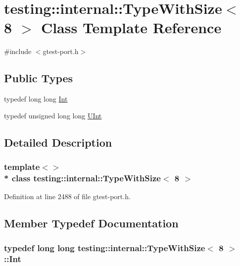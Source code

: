 \hypertarget{classtesting_1_1internal_1_1_type_with_size_3_018_01_4}{}\section{testing\+:\+:internal\+:\+:Type\+With\+Size$<$ 8 $>$ Class Template Reference}
\label{classtesting_1_1internal_1_1_type_with_size_3_018_01_4}


{\ttfamily \#include $<$gtest-\/port.\+h$>$}

\subsection*{Public Types}
\begin{DoxyCompactItemize}
\item 
typedef long long \hyperlink{classtesting_1_1internal_1_1_type_with_size_3_018_01_4_a36d5697e5f5254b0495f13c97d747e36}{Int}
\item 
typedef unsigned long long \hyperlink{classtesting_1_1internal_1_1_type_with_size_3_018_01_4_a747e21c5aee8faf07ec65cd4c3d1ca62}{U\+Int}
\end{DoxyCompactItemize}


\subsection{Detailed Description}
\subsubsection*{template$<$$>$\\*
class testing\+::internal\+::\+Type\+With\+Size$<$ 8 $>$}



Definition at line 2488 of file gtest-\/port.\+h.



\subsection{Member Typedef Documentation}
\subsubsection[{\texorpdfstring{Int}{Int}}]{\setlength{\rightskip}{0pt plus 5cm}typedef long long {\bf testing\+::internal\+::\+Type\+With\+Size}$<$ 8 $>$\+::{\bf Int}}\hypertarget{classtesting_1_1internal_1_1_type_with_size_3_018_01_4_a36d5697e5f5254b0495f13c97d747e36}{}\label{classtesting_1_1internal_1_1_type_with_size_3_018_01_4_a36d5697e5f5254b0495f13c97d747e36}


